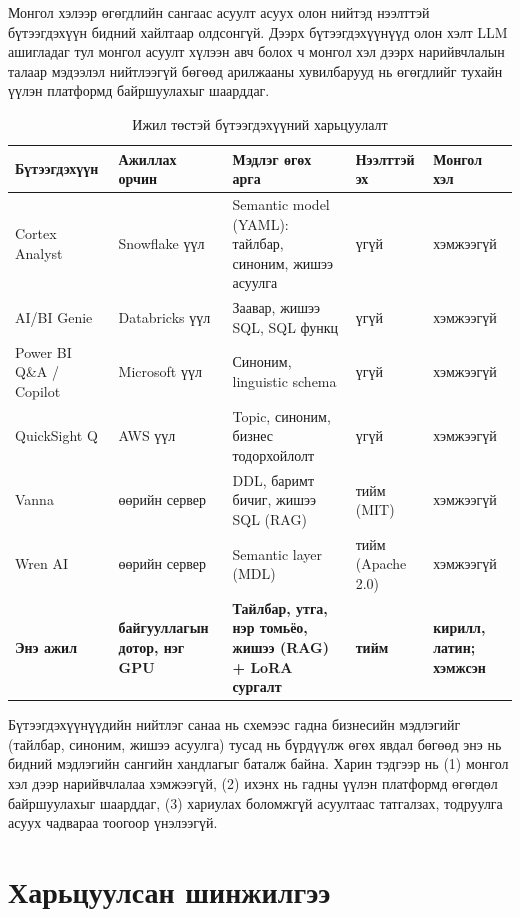 Монгол хэлээр өгөгдлийн сангаас асуулт асуух олон нийтэд нээлттэй бүтээгдэхүүн бидний хайлтаар олдсонгүй. Дээрх
бүтээгдэхүүнүүд олон хэлт LLM ашигладаг тул монгол асуулт хүлээн авч болох ч монгол хэл дээрх нарийвчлалын талаар
мэдээлэл нийтлээгүй бөгөөд арилжааны хувилбарууд нь өгөгдлийг тухайн үүлэн платформд байршуулахыг шаарддаг.

\begin{table}[H]
\centering\scriptsize
\caption{Ижил төстэй бүтээгдэхүүний харьцуулалт}
\label{tab:products}
\begin{tabularx}{\textwidth}{p{2.5cm}p{2.0cm}X p{1.5cm}p{1.6cm}}
\toprule
Бүтээгдэхүүн & Ажиллах орчин & Мэдлэг өгөх арга & Нээлттэй эх & Монгол хэл \\
\midrule
Cortex Analyst & Snowflake үүл & Semantic model (YAML): тайлбар, синоним, жишээ асуулга & үгүй & хэмжээгүй \\
AI/BI Genie & Databricks үүл & Заавар, жишээ SQL, SQL функц & үгүй & хэмжээгүй \\
Power BI Q\&A / Copilot & Microsoft үүл & Синоним, linguistic schema & үгүй & хэмжээгүй \\
QuickSight Q & AWS үүл & Topic, синоним, бизнес тодорхойлолт & үгүй & хэмжээгүй \\
Vanna & өөрийн сервер & DDL, баримт бичиг, жишээ SQL (RAG) & тийм (MIT) & хэмжээгүй \\
Wren AI & өөрийн сервер & Semantic layer (MDL) & тийм (Apache 2.0) & хэмжээгүй \\
\textbf{Энэ ажил} & \textbf{байгууллагын дотор, нэг GPU} & \textbf{Тайлбар, утга, нэр томьёо, жишээ (RAG) + LoRA сургалт} &
  \textbf{тийм} & \textbf{кирилл, латин; хэмжсэн} \\
\bottomrule
\end{tabularx}
\end{table}

Бүтээгдэхүүнүүдийн нийтлэг санаа нь схемээс гадна бизнесийн мэдлэгийг (тайлбар, синоним, жишээ асуулга) тусад нь
бүрдүүлж өгөх явдал бөгөөд энэ нь бидний мэдлэгийн сангийн хандлагыг баталж байна. Харин тэдгээр нь (1) монгол хэл дээр
нарийвчлалаа хэмжээгүй, (2) ихэнх нь гадны үүлэн платформд өгөгдөл байршуулахыг шаарддаг, (3) хариулах боломжгүй асуултаас
татгалзах, тодруулга асуух чадвараа тоогоор үнэлээгүй.

\section{Харьцуулсан шинжилгээ}
\label{sec:comparison}

